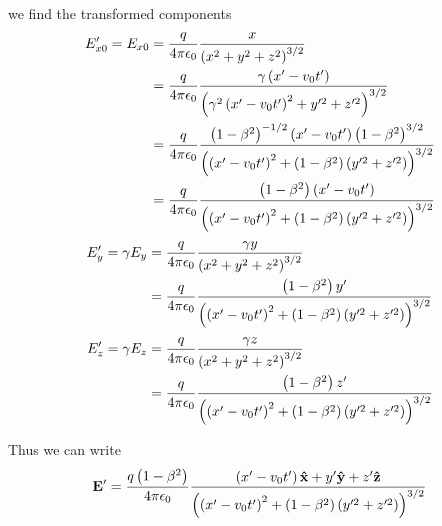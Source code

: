 \documentclass[oneside, 10pt, notitlepage]{book}
\begin{document}
we find the transformed components 
\begin{equation}
\begin{split}
    E'_{x0} = E_{x0} &= \frac{q}{4\pi\epsilon_0} \frac{x}{\left(x^2 + y^2 + z^2\right)^{3/2}} \\
    &= \frac{q}{4\pi\epsilon_0} \frac{\gamma \left(x'- v_0 t'\right)}{\left(\gamma^2\left(x'- v_0 t'\right)^2 + y'^2 + z'^2\right)^{3/2}} \\
    &= \frac{q}{4\pi\epsilon_0} \frac{\left(1-\beta^2\right)^{-1/2} \left(x'- v_0 t'\right)\left(1-\beta^2\right)^{3/2}}{\left(\left(x'- v_0 t'\right)^2 + \left(1-\beta^2\right)\left(y'^2 + z'^2\right)\right)^{3/2}} \\
    &= \frac{q}{4\pi\epsilon_0} \frac{\left(1-\beta^2\right) \left(x'- v_0 t'\right)}{\left(\left(x'- v_0 t'\right)^2 + \left(1-\beta^2\right)\left(y'^2 + z'^2\right)\right)^{3/2}}
\end{split}
\end{equation}
\begin{equation}
\begin{split}
    E'_y = \gamma E_y &= \frac{q}{4\pi\epsilon_0} \frac{\gamma y}{\left(x^2 + y^2 + z^2\right)^{3/2}} \\
    &= \frac{q}{4\pi\epsilon_0} \frac{\left(1-\beta^2\right) y'}{\left(\left(x'- v_0 t'\right)^2 + \left(1-\beta^2\right)\left(y'^2 + z'^2\right)\right)^{3/2}}
\end{split}
\end{equation}
\begin{equation}
\begin{split}
    E'_z = \gamma E_z &= \frac{q}{4\pi\epsilon_0} \frac{\gamma z}{\left(x^2 + y^2 + z^2\right)^{3/2}} \\
    &= \frac{q}{4\pi\epsilon_0} \frac{\left(1-\beta^2\right) z'}{\left(\left(x'- v_0 t'\right)^2 + \left(1-\beta^2\right)\left(y'^2 + z'^2\right)\right)^{3/2}}
\end{split}
\end{equation}

Thus we can write 
\begin{equation}
    \vb{E}' = \frac{q \left(1-\beta^2\right)}{4\pi \epsilon_0}\frac{\left(x' - v_0 t'\right)\vu{x} + y' \vu{y} + z'\vu{z}}{\left(\left(x'- v_0 t'\right)^2 + \left(1-\beta^2\right)\left(y'^2 + z'^2\right)\right)^{3/2}}
\end{equation}
\end{document}
